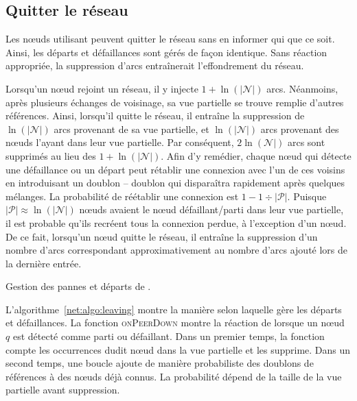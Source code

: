 \subsection{Quitter le réseau}
\label{net:subsec:leaving}

Les nœuds utilisant \SPRAY peuvent quitter le réseau sans en informer qui que ce
soit. Ainsi, les départs et défaillances sont gérés de façon identique. Sans
réaction appropriée, la suppression d'arcs entraînerait l'effondrement du
réseau.

Lorsqu'un nœud rejoint un réseau, il y injecte $1+\ln(|\mathcal{N}|)$
arcs. Néanmoins, après plusieurs échanges de voisinage, sa vue partielle se
trouve remplie d'autres références. Ainsi, lorsqu'il quitte le réseau, il
entraîne la suppression de $\ln(|\mathcal{N}|)$ arcs provenant de sa vue
partielle, et $\ln(|\mathcal{N}|)$ arcs provenant des nœuds l'ayant dans leur
vue partielle. Par conséquent, $2\ln(\mathcal{N}|)$ arcs sont supprimés au lieu
des $1+\ln(|\mathcal{N}|)$. Afin d'y remédier, chaque nœud qui détecte une
défaillance ou un départ peut rétablir une connexion avec l'un de ces voisins en
introduisant un doublon -- doublon qui disparaîtra rapidement après quelques
mélanges. La probabilité de réétablir une connexion est
$1-1\div{|\mathcal{P}|}$. Puisque ${|\mathcal{P}|}\approx \ln(|\mathcal{N}|)$
nœuds avaient le nœud défaillant/parti dans leur vue partielle, il est probable
qu'ils recréent tous la connexion perdue, à l'exception d'un nœud. De ce fait,
lorsqu'un nœud quitte le réseau, il entraîne la suppression d'un nombre d'arcs
correspondant approximativement au nombre d'arcs ajouté lors de la dernière
entrée.

\begin{algorithm}[h]
  
  \caption[Gestion des pannes et départs de \SPRAY]
  {\label{net:algo:leaving}Gestion des pannes et départs de \SPRAY.}
\end{algorithm}

L'algorithme~\ref{net:algo:leaving} montre la manière selon laquelle \SPRAY gère
les départs et défaillances. La fonction \textsc{onPeerDown} montre la réaction
de \SPRAY lorsque un nœud $q$ est détecté comme parti ou défaillant. Dans un
premier temps, la fonction compte les occurrences dudit nœud dans la vue
partielle et les supprime. Dans un second temps, une boucle ajoute de manière
probabiliste des doublons de références à des nœuds déjà connus. La probabilité
dépend de la taille de la vue partielle avant suppression.

